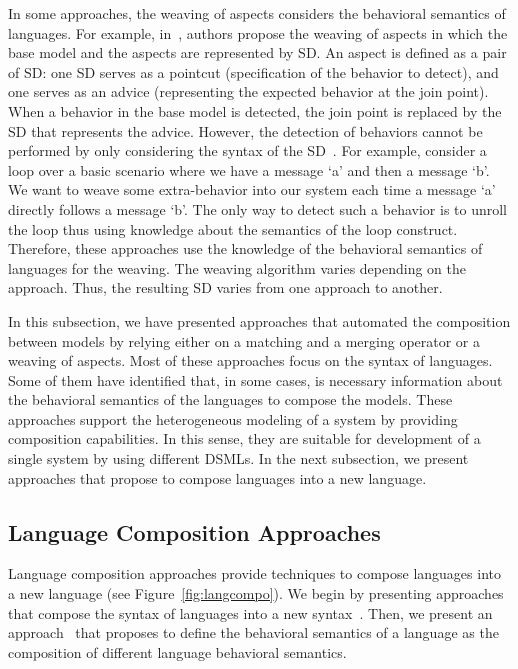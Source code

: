 In some approaches, the weaving of aspects considers the behavioral semantics of languages. For example, in~\cite{rambib}, authors propose the weaving of aspects in which the base model and the aspects are represented by SD. An aspect is defined as a pair of SD: one SD serves as a pointcut (specification of the behavior to detect), and one serves as an advice (representing the expected behavior at the join point). When a behavior in the base model is detected, the join point is replaced by the SD that represents the advice. However, the detection of behaviors cannot be performed by only considering the syntax of the SD~\cite{problemsweavebib}. For example, consider a loop over a basic scenario where we have a message `a' and then a message `b'. We want to weave some extra-behavior into our system each time a message `a' directly follows a message `b'. The only way to detect such a behavior is to unroll the loop thus using knowledge about the semantics of the loop construct. Therefore, these approaches use the knowledge of the behavioral semantics of languages for the weaving. The weaving algorithm varies depending on the approach. Thus, the resulting SD varies from one approach to another.

In this subsection, we have presented approaches that automated the composition between models by relying either on a matching and a merging operator or a weaving of aspects. Most of these approaches focus on the syntax of languages. Some of them have identified that, in some cases, is necessary information about the behavioral semantics of the languages to compose the models. These approaches support the heterogeneous modeling of a system by providing composition capabilities. In this sense, they are suitable for development of a single system by using different DSMLs. In the next subsection, we present approaches that propose to compose languages into a new language.

\subsection{Language Composition Approaches}
Language composition approaches provide techniques to compose languages into a new language (see Figure~\ref{fig:langcompo}). We begin by presenting approaches that compose the syntax of languages into a new syntax~\cite{metamodelcompo}. Then, we present an approach~\cite{semanticsanchoring} that proposes to define the behavioral semantics of a language as the composition of different language behavioral semantics. 

